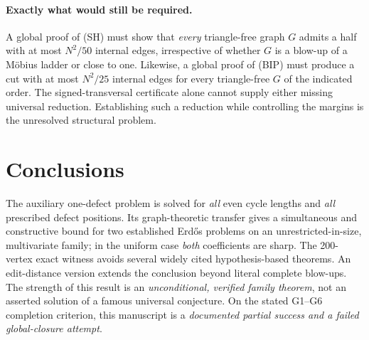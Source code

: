 \documentclass[11pt,a4paper]{article}
\begin{document}
\paragraph{Exactly what would still be required.}
A global proof of (SH) must show that \emph{every} triangle-free graph $G$ admits a half with at most $N^2/50$ internal edges, irrespective of whether $G$ is a blow-up of a M\"obius ladder or close to one. Likewise, a global proof of (BIP) must produce a cut with at most $N^2/25$ internal edges for every triangle-free $G$ of the indicated order. The signed-transversal certificate alone cannot supply either missing universal reduction. Establishing such a reduction while controlling the margins is the unresolved structural problem.

\section{Conclusions}
The auxiliary one-defect problem is solved for \emph{all} even cycle lengths and \emph{all} prescribed defect positions. Its graph-theoretic transfer gives a simultaneous and constructive bound for two established Erd\H{o}s problems on an unrestricted-in-size, multivariate family; in the uniform case \emph{both} coefficients are sharp. The 200-vertex exact witness avoids several widely cited hypothesis-based theorems. An edit-distance version extends the conclusion beyond literal complete blow-ups. The strength of this result is an \emph{unconditional, verified family theorem}, not an asserted solution of a famous universal conjecture. On the stated G1--G6 completion criterion, this manuscript is a \emph{documented partial success and a failed global-closure attempt}.

\appendix
\end{document}

